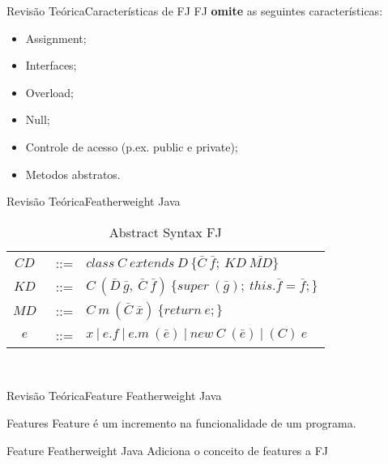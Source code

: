 \documentclass{beamer}
\begin{document}
	\begin{frame}{Revisão Teórica}{Características de FJ}
		FJ \textbf{omite} as seguintes características:
		\begin{itemize}
			\item Assignment;
			\item Interfaces;
			\item Overload;
			\item Null;
			\item Controle de acesso (p.ex. public e private);
			\item Metodos abstratos.
		\end{itemize}
	 \end{frame}
	
	\begin{frame}{Revisão Teórica}{Featherweight Java}
		\centering
		\begin{table}[ht!]
			\caption{Abstract Syntax FJ}
			\begin{tabular}{ccl}
				$CD$&~::= & $class\ C~extends~D\ \{\bar{C} \ \bar{f};\ KD\
				\bar{MD}\}$\\ 
				\vspace{0.8mm}
				$KD$&~::= &
				$C~(\bar{D}~\bar{g},\ \bar{C}~\bar{f})\
				\{super~(\bar{g});~this.\bar{f}=\bar{f};\}$\\
				\vspace{0.8mm}
				$MD$&~::= & $C~m~(\bar{C}~\bar{x})\ \{return~e;\}$\\
				\vspace{0.8mm}
				$e$&~::= & $x~|~e.f~|~e.m~(\bar{e})~|~new~C~(\bar{e})~|~(C)~e$ \\
			\end{tabular} \\
			\vspace{1.5mm}
			\label{abstractsyntax}
		\end{table}
	\end{frame}
	
	\begin{frame}{Revisão Teórica}{Feature Featherweight Java}
		\centering
		\begin{block}{Features}
			Feature é um incremento na funcionalidade de um programa.
		\end{block}
		\begin{block}{Feature Featherweight Java}
			Adiciona o conceito de features a FJ
		\end{block}
	\end{frame}	
	
\end{document}
